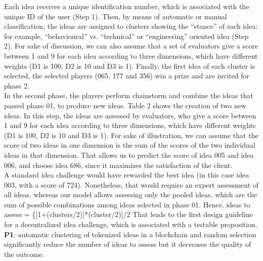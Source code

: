\documentclass[]{elsarticle} %
\begin{document}
Each idea receives a unique identification number, which is associated
with the unique ID of the user (Step 1). Then, by means of automatic or
manual classification, the ideas are assigned to clusters showing the
``stance'' of each idea: for example, ``behavioural'' vs. ``technical''
or ``engineering'' oriented idea (Step 2). For sake of discussion, we
can also assume that a set of evaluators give a score between 1 and 9
for each idea according to three dimensions, which have different
weights (D1 is 100, D2 is 10 and D3 is 1). Finally, the first idea of
each cluster is selected, the selected players (065, 177 and 356) win a
prize and are invited for phase 2.\\
In the second phase, the players perform chainstorm and combine the
ideas that passed phase 01, to produce new ideas. Table 2 shows the
creation of two new ideas. In this step, the ideas are assessed by
evaluators, who give a score between 1 and 9 for each idea according to
three dimensions, which have different weights (D1 is 100, D2 is 10 and
D3 is 1). For sake of illustration, we can assume that the score of two
ideas in one dimension is the sum of the scores of the two individual
ideas in that dimension. That allows us to predict the score of idea 005
and idea 006, and choose idea 686, since it maximizes the satisfaction
of the client.\\
A standard idea challenge would have rewarded the best idea (in this
case idea 003, with a score of 724). Nonetheless, that would require an
expert assessment of all ideas, whereas our model allows assessing only
the pooled ideas, which are the sum of possible combinations among ideas
selected in phase 01. Hence, ideas to assess =
\{{[}1+(clusters/2){]}*(cluster/2){]}/2 That leads to the first design
guideline for a decentralized idea challenge, which is associated with a
testable proposition.\\
\textbf{P1}: automatic clustering of tokenized ideas in a blockchain and
random selection significantly reduce the number of ideas to assess but
it decreases the quality of the outcome.
\end{document}
